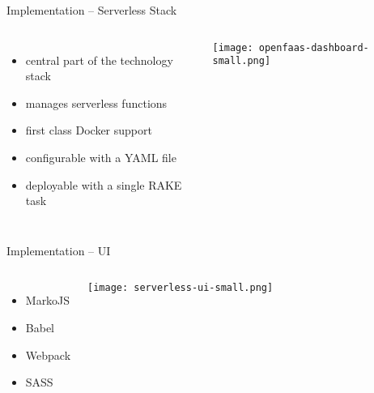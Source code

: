 \documentclass[aspectratio=169]{beamer}
\begin{document}
  \begin{frame}{Implementation -- Serverless Stack}
    \begin{columns}
        \begin{itemize}
          \item central part of the technology stack
          \item manages serverless functions
          \item first class Docker support
          \item configurable with a YAML file
          \item deployable with a single RAKE task
        \end{itemize}
        \vfill
        \centering
        \texttt{[image: openfaas-dashboard-small.png]}
     \end{columns}
  \end{frame}

  \begin{frame}{Implementation -- UI}
    \begin{columns}
        \begin{itemize}
          \item MarkoJS
          \item Babel
          \item Webpack
          \item SASS
        \end{itemize}
        \vfill
        \centering
        \texttt{[image: serverless-ui-small.png]}
     \end{columns}
  \end{frame}
\end{document}
